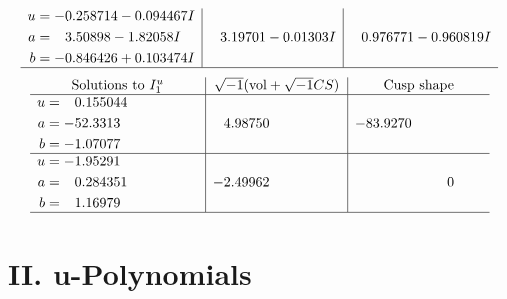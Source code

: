 \documentclass[1p]{elsarticle_modified}
\theoremstyle{definition}
\newcommand{\I}{\sqrt{-1}}
\begin{document}
$$\begin{array}{c|c|c}
\begin{aligned}
u &= -0.258714 - 0.094467 I \\
a &= \phantom{-}3.50898 - 1.82058 I \\
b &= -0.846426 + 0.103474 I\end{aligned}
 & \phantom{-}3.19701 - 0.01303 I & \phantom{-}0.976771 - 0.960819 I\\
 \hline 
 \end{array}$$\newpage$$\begin{array}{c|c|c}  
\text{Solutions to }I^u_{1}& \I (\text{vol} + \sqrt{-1}CS) & \text{Cusp shape}\\
 \hline 
\begin{aligned}
u &= \phantom{-}0.155044\phantom{ +0.000000I} \\
a &= -52.3313\phantom{ +0.000000I} \\
b &= -1.07077\phantom{ +0.000000I}\end{aligned}
 & \phantom{-}4.98750\phantom{ +0.000000I} & -83.9270\phantom{ +0.000000I} \\ \hline\begin{aligned}
u &= -1.95291\phantom{ +0.000000I} \\
a &= \phantom{-}0.284351\phantom{ +0.000000I} \\
b &= \phantom{-}1.16979\phantom{ +0.000000I}\end{aligned}
 & -2.49962\phantom{ +0.000000I} & \phantom{-0.000000 } 0\\
 \hline 
 \end{array}$$\newpage
\newpage\renewcommand{\arraystretch}{1}
\centering \section*{ II. u-Polynomials}
\end{document}

